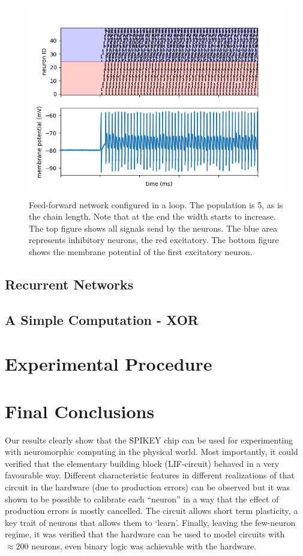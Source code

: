 \documentclass[10pt,a4paper]{article}
\begin{document}
\begin{figure}
    \centering
    \includegraphics[width=.5\textwidth]{figures/feedforward signals loop.png}
    \caption{Feed-forward network configured in a loop. The population is 5, as
        is the chain length. Note that at the end the width starts to increase.
        The top figure shows all signals send by the neurons. The blue area
        represents inhibitory neurons, the red excitatory. The bottom figure
        shows the membrane potential of the first excitatory neuron.}
    \label{fig:feed-forward-loop}
\end{figure}


\subsection{Recurrent Networks}

\subsection{A Simple Computation - XOR}

\section{Experimental Procedure}

\section{Final Conclusions}
Our results clearly show that the SPIKEY chip can be used for experimenting with
neuromorphic computing in the physical world. Most importantly, it could
verified that the elementary building block (LIF-circuit) behaved in a very
favourable way. Different characteristic features in different realizations of
that circuit in the hardware (due to production errors) can be observed but it
was shown to be possible to calibrate each  ``neuron'' in a way that the effect
of production errors is mostly cancelled. The circuit allows short term
plasticity,  a key trait of neurons that allows them to `learn'.  Finally,
leaving the few-neuron regime, it was verified that the hardware can be used to
model circuits with $\approx 200$ neurons, even binary logic was achievable with
the hardware.
\end{document}
